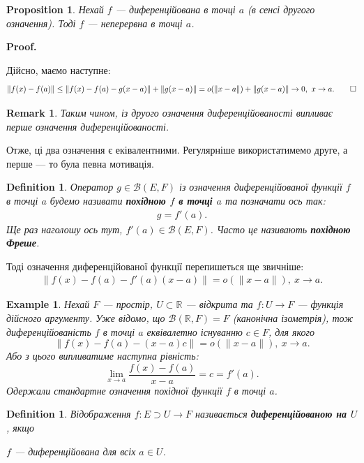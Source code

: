 \documentclass[a4paper, 10pt]{article}
\makeatletter
\theoremstyle{theoremdd}
\theoremstyle{theoremdd}
\newtheorem{definition}[theorem]{Definition}
\theoremstyle{theoremdd}
\theoremstyle{theoremdd}
\newtheorem{example}[theorem]{Example}
\theoremstyle{theoremdd}
\newtheorem{proposition}[theorem]{Proposition}
\theoremstyle{theoremdd}
\newtheorem{remark}[theorem]{Remark}
\theoremstyle{theoremdd}
\theoremstyle{theoremdd}
\renewenvironment{proof}[1][Proof.\\]{\par
\pushQED{\hfill \qed}%
\normalfont \topsep6\p@\@plus6\p@\relax
\trivlist
\item\relax
{\bfseries
#1\@addpunct{.}}\hspace\labelsep\ignorespaces
}{%
\popQED\endtrivlist\@endpefalse
}
\makeatother
\begin{document}
\begin{proposition}
Нехай $f$ --- диференційована в точці $a$ (\textit{в сенсі другого означення}). Тоді $f$ --- неперервна в точці $a$.
\end{proposition}

\begin{proof}
Дійсно, маємо наступне:
\[
\| f(x) - f(a) \| \leq \| f(x) - f(a) - g(x-a) \| + \| g(x-a) \| = o(\|x-a\|) + \| g(x-a) \| \to 0,\ x \to a. \qedhere
\]
\end{proof}

\begin{remark}
Таким чином, із друого означення диференційованості випливає перше означення диференційованості.
\end{remark}
\noindent
Отже, ці два означення є еківалентними. Регулярніше використатимемо друге, а перше --- то була певна мотивація.

\begin{definition}
Оператор $g \in \mathcal{B}(E,F)$ із означення диференційованої функції $f$ в точці $a$ будемо називати \textbf{похідною $f$ в точці $a$} та позначати ось так:
\begin{align*}
g = f'(a).
\end{align*}
Ще раз наголошу ось тут, $f'(a) \in \mathcal{B}(E,F)$. Часто це називають \textbf{похідною Фреше}.
\end{definition}

Тоді означення диференційованої функції перепишеться ще звичніше:
\begin{align*}
\|f(x) - f(a) - f'(a) (x-a) \| = o(\|x-a\|),\ x \to a.
\end{align*}

\begin{example}
Нехай $F$ --- простір, $U \subset \mathbb{R}$ --- відкрита та $f \colon U \to F$ --- функція дійсного аргументу. Уже відомо, що $\mathcal{B}(\mathbb{R},F) = F$ (\textit{канонічна ізометрія}), тож диференційованість $f$ в точці $a$ еквівалетно існуванню $c \in F$, для якого
\[
\| f(x) - f(a) - (x-a)c \| = o(\|x-a\|),\ x \to a.
\]
Або з цього випливатиме наступна рівність:
\[
\lim_{x \to a} \dfrac{f(x)-f(a)}{x-a} = c = f'(a).
\]
Одержали стандартне означення похідної функції $f$ в точці $a$.
\end{example}

\begin{definition}
Відображення $f \colon E \supset U \to F$ називається \textbf{диференційованою на $U$}, якщо
\begin{center}
$f$ --- диференційована для всіх $a \in U$.
\end{center}
\end{definition}
\end{document}
